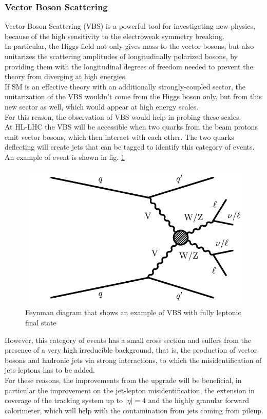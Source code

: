 \subsubsection{Vector Boson Scattering}
Vector Boson Scattering (VBS) is a powerful tool for investigating new physics, because of the high sensitivity to the electroweak symmetry breaking.\\
In particular, the Higgs field not only gives mass to the vector bosons, but also unitarizes the scattering amplitudes of longitudinally polarized bosons, by providing them with the longitudinal degrees of freedom needed to prevent the theory from diverging at high energies.\\
If SM is an effective theory with an additionally strongly-coupled sector, the unitarization of the VBS wouldn't come from the Higgs boson only, but from this new sector as well, which would appear at high energy scales.\\
For this reason, the observation of VBS would help in probing these scales.\\
At HL-LHC the VBS will be accessible when two quarks from the beam protons emit vector bosons, which then interact with each other. The two quarks deflecting will create jets that can be tagged to identify this category of events.\\ 
An example of event is shown in fig. \ref{vbs}
\begin{figure}[ht]
    \centering
    \includegraphics[width=0.4\linewidth]{images/vbs.png}
    \caption{Feynman diagram that shows an example of VBS with fully leptonic final state}
    \label{vbs}
\end{figure}
However, this category of events has a small cross section and suffers from the presence of a very high irreducible background, that is, the production of vector bosons and hadronic jets via strong interactions, to which the misidentification of jets-leptons has to be added.\\
For these reasons, the improvements from the upgrade will be beneficial, in particular the improvement on the jet-lepton misidentification, the extension in coverage of the tracking system up to $|\eta| = 4$ and the highly granular forward calorimeter, which will help with the contamination from jets coming from pileup.


